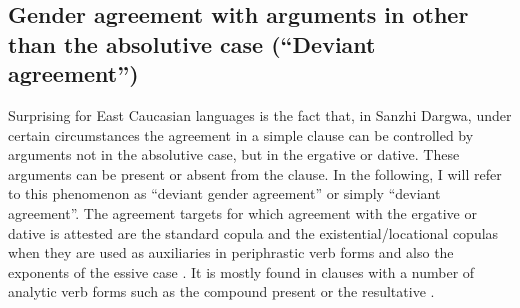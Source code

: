 
\subsection{Gender agreement with arguments in other than the absolutive case (``Deviant agreement'')}
\label{ssec:Gender agreement with arguments in other than the absolutive case}

Surprising for East Caucasian languages is the fact that, in Sanzhi Dargwa, under certain circumstances the agreement in a simple clause can be controlled by arguments not in the absolutive case, but in the ergative or dative. These arguments can be present or absent from the clause. In the following, I will refer to this phenomenon as ``deviant gender agreement'' or simply ``deviant agreement''. The agreement targets for which agreement with the ergative or dative is attested are the standard copula  and the existential/locational copulas  when they are used as auxiliaries in periphrastic verb forms and also the exponents of the essive case . It is mostly found in clauses with a number of analytic verb forms such as the compound present  or the resultative . 

